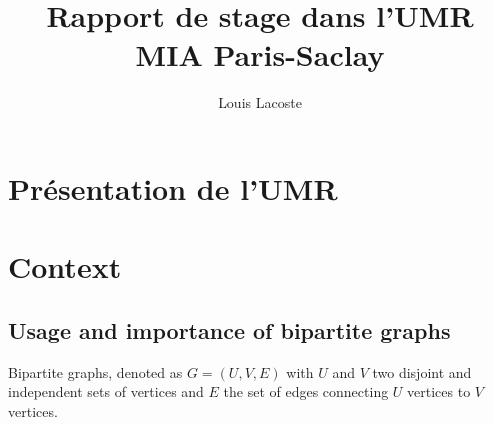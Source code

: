 \documentclass[12pt,a4paper]{report}
\title{Rapport de stage dans l'UMR MIA Paris-Saclay}
\author{Louis Lacoste}
\begin{document}
\maketitle
\tableofcontents

\chapter{Présentation de l'UMR}

\chapter{Context}

\section{Usage and importance of bipartite graphs}
\label{sec:usage-and-importance-of-bipartite-graphs}
Bipartite graphs, denoted as $G = (U,V,E)$ with $U$ and $V$ two disjoint and
independent sets of vertices and $E$ the set of edges connecting $U$ vertices to
$V$ vertices.
\end{document}
